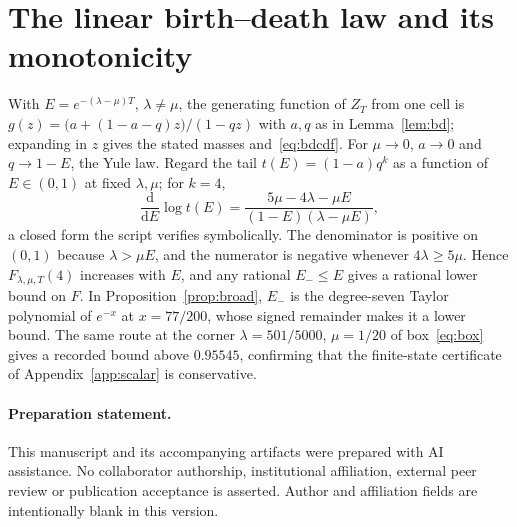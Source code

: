 \documentclass[11pt,a4paper]{article}
\theoremstyle{plain}
\theoremstyle{definition}
\theoremstyle{remark}
\newcommand{\dd}{\mathrm d}
\begin{document}
\section{The linear birth--death law and its monotonicity}\label{app:bd}
With $E=e^{-(\lambda-\mu)T}$, $\lambda\ne\mu$, the generating function of $Z_T$ from one cell is $g(z)=\bigl(a+(1-a-q)z\bigr)/(1-qz)$ with $a,q$ as in Lemma~\ref{lem:bd}; expanding in $z$ gives the stated masses and~\eqref{eq:bdcdf}. For $\mu\to0$, $a\to0$ and $q\to1-E$, the Yule law. Regard the tail $t(E)=(1-a)q^k$ as a function of $E\in(0,1)$ at fixed $\lambda,\mu$; for $k=4$,
\[
\frac{\dd}{\dd E}\log t(E)=\frac{5\mu-4\lambda-\mu E}{(1-E)(\lambda-\mu E)},
\]
a closed form the script verifies symbolically. The denominator is positive on $(0,1)$ because $\lambda>\mu E$, and the numerator is negative whenever $4\lambda\ge5\mu$. Hence $F_{\lambda,\mu,T}(4)$ increases with $E$, and any rational $E_-\le E$ gives a rational lower bound on $F$. In Proposition~\ref{prop:broad}, $E_-$ is the degree-seven Taylor polynomial of $e^{-x}$ at $x=77/200$, whose signed remainder makes it a lower bound. The same route at the corner $\lambda=501/5000$, $\mu=1/20$ of box~\eqref{eq:box} gives a recorded bound above $0.95545$, confirming that the finite-state certificate of Appendix~\ref{app:scalar} is conservative.

\paragraph{Preparation statement.} This manuscript and its accompanying artifacts were prepared with AI assistance. No collaborator authorship, institutional affiliation, external peer review or publication acceptance is asserted. Author and affiliation fields are intentionally blank in this version.



\end{document}
